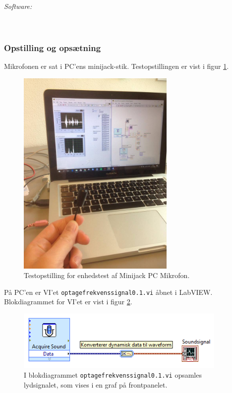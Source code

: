 			\textit{Software:}\\
			\labview\\
			\onlineg\\
	
		\subsubsection{Opstilling og opsætning}
		Mikrofonen er sat i PC'ens minijack-stik. Testopstillingen er vist i figur \ref{fig:etmik}.\\ 
	  
			\begin{figure}[htb]
			\centering
				\includegraphics[width=3in]{mikopstilling}
				\caption{Testopstilling for enhedstest af Minijack PC Mikrofon.}	
				\label{fig:etmik}
			\end{figure}
	
			På PC'en er VI'et \texttt{optagefrekvenssignal0.1.vi} åbnet i LabVIEW. Blokdiagrammet for VI'et er vist i figur \ref{fig:bdoptage}.   \\   
	
			\begin{figure}[htb]
			\centering
				\includegraphics[width=4in]{optagefrekvenssignal01}
				\caption{I blokdiagrammet \texttt{optagefrekvenssignal0.1.vi} opsamles lydsignalet, som vises i en graf på frontpanelet.}	
				\label{fig:bdoptage}
			\end{figure}	  
			
